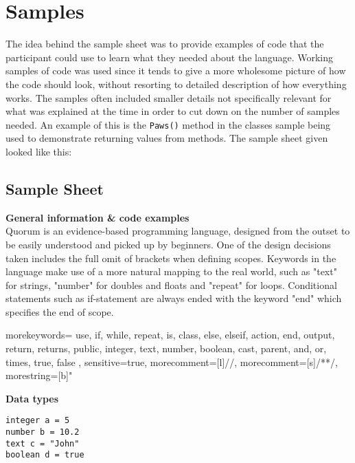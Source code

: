 \section{Samples}
The idea behind the sample sheet was to provide examples of code that the participant could use to learn what they needed about the language.
Working samples of code was used since it tends to give a more wholesome picture of how the code should look, without resorting to detailed description of how everything works.
The samples often included smaller details not specifically relevant for what was explained at the time in order to cut down on the number of samples needed.
An example of this is the \lstinline!Paws()! method in the classes sample being used to demonstrate returning values from methods.
The sample sheet given looked like this:%

\subsection{Sample Sheet}
\textbf{General information \& code examples}\\
Quorum is an evidence-based programming language, designed from the outset to be easily understood and picked up by beginners. One of the design decisions taken includes the full omit of brackets when defining scopes. Keywords in the language make use of a more natural mapping to the real world, such as "text" for strings, "number" for doubles and floats  and "repeat" for loops. Conditional statements such as if-statement are always ended with the keyword "end" which specifies the end of scope.

{
  morekeywords={
    use,
    if,
    while,
    repeat,
    is,
    class,
    else,
    elseif,
    action,
    end,
    output,
    return,
    returns,
    public,
    integer,
    text,
    number,
    boolean,
    cast,
    parent,
    and,
    or,
    times,
    true,
    false
  },
  sensitive=true, %
  morecomment=[l]{//}, %
  morecomment=[s]{/*}{*/}, %
  morestring=[b]" %
}

\textbf{Data types}\\
\begin{lstlisting}[language=Quorum]
integer a = 5
number b = 10.2
text c = "John"
boolean d = true
\end{lstlisting}

